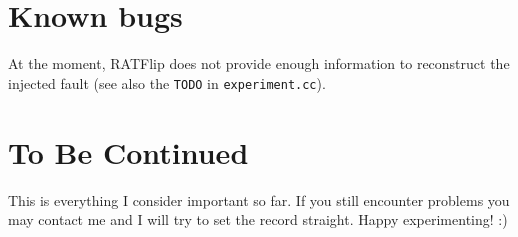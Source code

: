 \documentclass[a4paper,10pt]{article}
\begin{document}
\section{Known bugs}

At the moment, RATFlip does not provide enough information
to reconstruct the injected fault
(see also the \texttt{TODO} in \texttt{experiment.cc}).

\section{To Be Continued}

This is everything I consider important so far. If you still encounter
problems you may
contact me and I will try to set the record straight.
Happy experimenting! :)
\end{document}
